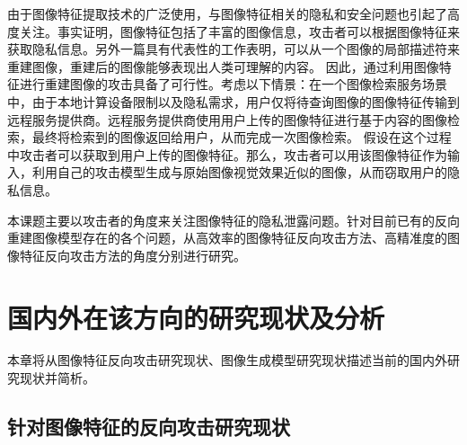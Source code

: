 \par
由于图像特征提取技术的广泛使用，与图像特征相关的隐私和安全问题也引起了高度关注\cite{9762698}\cite{Qin2014TowardsEP}。事实证明，图像特征包括了丰富的图像信息，攻击者可以根据图像特征来获取隐私信息\cite{10214250}\cite{10.1145/3386082}。另外一篇具有代表性的工作\cite{5995616}表明，可以从一个图像的局部描述符来重建图像，重建后的图像能够表现出人类可理解的内容。
因此，通过利用图像特征进行重建图像的攻击具备了可行性。考虑以下情景：在一个图像检索服务场景中，由于本地计算设备限制以及隐私需求，用户仅将待查询图像的图像特征传输到远程服务提供商。远程服务提供商使用用户上传的图像特征进行基于内容的图像检索，最终将检索到的图像返回给用户，从而完成一次图像检索。
假设在这个过程中攻击者可以获取到用户上传的图像特征。那么，攻击者可以用该图像特征作为输入，利用自己的攻击模型生成与原始图像视觉效果近似的图像\cite{10.1145/3599589.3599596}\cite{SUN2020102642}，从而窃取用户的隐私信息。
\par
本课题主要以攻击者的角度来关注图像特征的隐私泄露问题。针对目前已有的反向重建图像模型存在的各个问题，从高效率的图像特征反向攻击方法、高精准度的图像特征反向攻击方法的角度分别进行研究。
\section{国内外在该方向的研究现状及分析}
本章将从图像特征反向攻击研究现状、图像生成模型研究现状描述当前的国内外研究现状并简析。
\subsection{针对图像特征的反向攻击研究现状}

